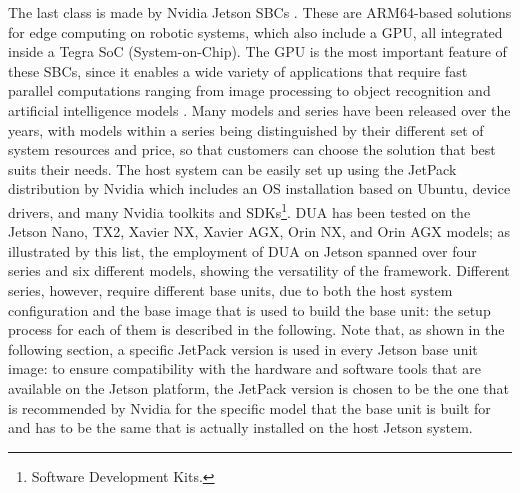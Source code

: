 The last class is made by Nvidia Jetson SBCs \cite{nvidia_jetson_nodate}. These are ARM64-based solutions for edge computing on robotic systems, which also include a GPU, all integrated inside a Tegra SoC (System-on-Chip). The GPU is the most important feature of these SBCs, since it enables a wide variety of applications that require fast parallel computations ranging from image processing to object recognition and artificial intelligence models \cite{song_hardware_2024}. Many models and series have been released over the years, with models within a series being distinguished by their different set of system resources and price, so that customers can choose the solution that best suits their needs. The host system can be easily set up using the JetPack distribution by Nvidia \cite{nvidia_jetpack_nodate} which includes an OS installation based on Ubuntu, device drivers, and many Nvidia toolkits and SDKs\footnote{Software Development Kits.}. DUA has been tested on the Jetson Nano, TX2, Xavier NX, Xavier AGX, Orin NX, and Orin AGX models; as illustrated by this list, the employment of DUA on Jetson spanned over four series and six different models, showing the versatility of the framework. Different series, however, require different base units, due to both the host system configuration and the base image that is used to build the base unit: the setup process for each of them is described in the following. Note that, as shown in the following section, a specific JetPack version is used in every Jetson base unit image: to ensure compatibility with the hardware and software tools that are available on the Jetson platform, the JetPack version is chosen to be the one that is recommended by Nvidia for the specific model that the base unit is built for and has to be the same that is actually installed on the host Jetson system.

